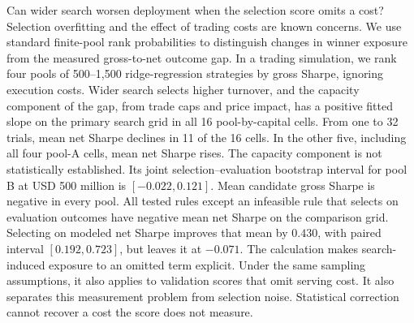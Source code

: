 Can wider search worsen deployment when the selection score omits a cost? Selection overfitting and the effect of trading costs are known concerns. We use standard finite-pool rank probabilities to distinguish changes in winner exposure from the measured gross-to-net outcome gap. In a trading simulation, we rank four pools of 500--1,500 ridge-regression strategies by gross Sharpe, ignoring execution costs. Wider search selects higher turnover, and the capacity component of the gap, from trade caps and price impact, has a positive fitted slope on the primary search grid in all 16 pool-by-capital cells. From one to 32 trials, mean net Sharpe declines in 11 of the 16 cells. In the other five, including all four pool-A cells, mean net Sharpe rises. The capacity component is not statistically established. Its joint selection--evaluation bootstrap interval for pool B at USD 500 million is $[-0.022,0.121]$. Mean candidate gross Sharpe is negative in every pool. All tested rules except an infeasible rule that selects on evaluation outcomes have negative mean net Sharpe on the comparison grid. Selecting on modeled net Sharpe improves that mean by $0.430$, with paired interval $[0.192,0.723]$, but leaves it at $-0.071$. The calculation makes search-induced exposure to an omitted term explicit. Under the same sampling assumptions, it also applies to validation scores that omit serving cost. It also separates this measurement problem from selection noise. Statistical correction cannot recover a cost the score does not measure.
